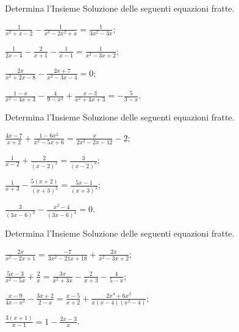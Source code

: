 \begin{esercizio}[\Ast]
 \label{ese:3.41}
Determina l'Insieme Soluzione delle seguenti equazioni fratte.
\begin{multicols}{2}
\begin{enumeratea}
\item $\frac{1}{x^{2} + x-2}-\frac{1}{x^{3}-2 x^{2} + x}=\frac{1}{3 x^{2}-3 x}$;
\item $\frac{1}{2 x-4}-\frac{2}{x + 1}-\frac{1}{x-1}=\frac{1}{x^{2}-3 x + 2}$;
\item $\frac{2 x}{x^{2} + 2 x-8}-\frac{2 x + 7}{x^{2}-3 x-4}= 0$;
\item $\frac{1-x}{x^{2}-4 x + 3}-\frac{4}{9-x^{2}} + \frac{x- 3}{x^{2} + 4 x + 3} =-\frac{5}{3-x}$.
\end{enumeratea}
\end{multicols}
\end{esercizio}

\begin{esercizio}[\Ast]
 \label{ese:3.42}
Determina l'Insieme Soluzione delle seguenti equazioni fratte.
\begin{multicols}{2}
\begin{enumeratea}
\item $\frac{4 x-7}{x + 2} + \frac{1-6 x^{2}}{x^{2}-5 x + 6} =\frac{x}{2 x^{2}-2 x-12}-2$;
\item $\frac{1}{x-2} + \frac{2}{(x-2)^{2}} = \frac{3}{(x-2)^{3}}$;
\item $\frac{1}{x + 3}-\frac{5 (x + 2)}{(x + 3)^{2}} = \frac{5 x- 1}{(x + 3)^{3}}$;
\item $\frac{3}{(3 x-6)^{2}}-\frac{x^{2}-4}{(3 x-6)^{4}} = 0$.
\end{enumeratea}
\end{multicols}
\end{esercizio}

\begin{esercizio}[\Ast]
 \label{ese:3.43}
Determina l'Insieme Soluzione delle seguenti equazioni fratte.
\begin{multicols}{2}
\begin{enumeratea}
\item $\frac{2 x}{x^{2}-2 x + 1} = \frac{- 7}{3 x^{2}-21 x + 18}+ \frac{2 x}{x^{2}-3 x + 2}$;
\item $\frac{5 x-3}{x^{2}-5 x} + \frac{2}{x} = \frac{3 x}{x^{2}+ 3 x}-\frac{2}{x + 3}-\frac{4}{5-x}$;
\item $\frac{x-9}{4 x-x^{2}}-\frac{3 x + 2}{2-x} = \frac{x-5}{x + 2} + \frac{2 x^{4} + 6 x^{3}}{x (x-4) (x^{2}-4)}$;
\item $\frac{3 (x + 1)}{x-1}=1-\frac{2 x-3}{x}$.
\end{enumeratea}
\end{multicols}
\end{esercizio}

